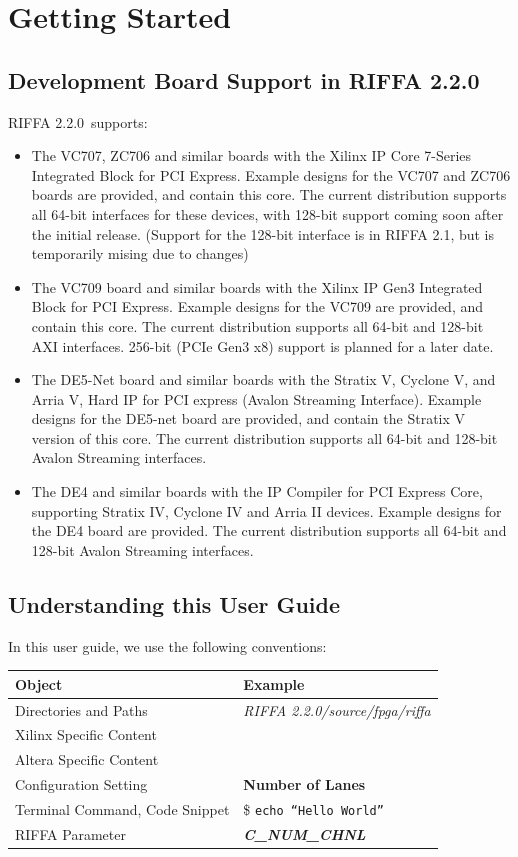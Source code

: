 \documentclass{refrep}
\newcommand{\RIFFAVer}{2.2.0}
\newcommand{\Directory}[1]{\textit{#1}}
\newcommand{\TermCmd}[1]{\$ \texttt{#1}}
\newcommand{\Xilinx}[1]{{\color{red}{#1}}}
\newcommand{\Altera}[1]{{\color{blue}{#1}}}
\newcommand{\ConfigSetting}[1]{\textbf{#1}}
\newcommand{\RIFFAParameter}[1]{\textit{\textbf{#1}}}
\begin{document}
\pagebreak
\chapter{Getting Started}
\section{Development Board Support in RIFFA \RIFFAVer}
RIFFA \RIFFAVer~supports:
\begin{itemize}
\item The VC707, ZC706 and similar boards with the Xilinx IP Core 7-Series
  Integrated Block for PCI Express. Example designs for the VC707 and ZC706
  boards are provided, and contain this core. The current distribution supports
  all 64-bit interfaces for these devices, with 128-bit support coming soon
  after the initial release. (Support for the 128-bit interface is in RIFFA 2.1,
  but is temporarily mising due to changes)
\item The VC709 board and similar boards with the Xilinx IP Gen3 Integrated
  Block for PCI Express. Example designs for the VC709 are provided, and contain
  this core. The current distribution supports all 64-bit and 128-bit AXI
  interfaces. 256-bit (PCIe Gen3 x8) support is planned for a later date.
\item The DE5-Net board and similar boards with the Stratix V, Cyclone V, and
  Arria V, Hard IP for PCI express (Avalon Streaming Interface). Example designs
  for the DE5-net board are provided, and contain the Stratix V version of this
  core. The current distribution supports all 64-bit and 128-bit Avalon
  Streaming interfaces.
\item The DE4 and similar boards with the IP Compiler for PCI Express Core,
  supporting Stratix IV, Cyclone IV and Arria II devices. Example designs for
  the DE4 board are provided. The current distribution supports all 64-bit and
  128-bit Avalon Streaming interfaces.
\end{itemize}
\section{Understanding this User Guide}
In this user guide, we use the following conventions:
\begin{center}
  \begin{tabular}{ | l | l |}
    \hline
    Object & Example \\ \hline
    Directories and Paths & \Directory{RIFFA \RIFFAVer/source/fpga/riffa}  \\ \hline
    Xilinx Specific Content & \Xilinx{vc709} \\ \hline
    Altera Specific Content & \Altera{de5} \\ \hline
    Configuration Setting & \ConfigSetting{Number of Lanes} \\ \hline
    Terminal Command, Code Snippet & \TermCmd{echo ``Hello World''}\\ \hline
    RIFFA Parameter & \RIFFAParameter{C\_NUM\_CHNL}\\\hline
  \end{tabular}
\end{center}
\end{document}
